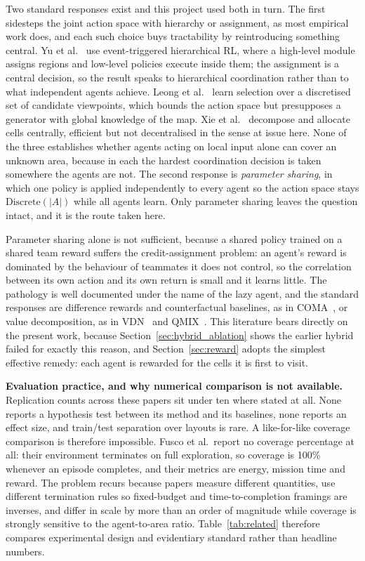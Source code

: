 \documentclass[a4paper, 10pt, conference]{ieeeconf}
\begin{document}
Two standard responses exist and this project used both in turn. The
first sidesteps the joint action space with hierarchy or assignment,
as most empirical work does, and each such choice buys tractability by
reintroducing something central. Yu et al.~\cite{yu2025} use
event-triggered hierarchical RL, where a high-level module assigns
regions and low-level policies execute inside them; the assignment is
a central decision, so the result speaks to hierarchical coordination
rather than to what independent agents achieve. Leong et
al.~\cite{leong2024} learn selection over a discretised set of
candidate viewpoints, which bounds the action space but presupposes a
generator with global knowledge of the map. Xie et al.~\cite{xie2025}
decompose and allocate cells centrally, efficient but not
decentralised in the sense at issue here. None of the three
establishes whether agents acting on local input alone can cover an
unknown area, because in each the hardest coordination decision is
taken somewhere the agents are not. The second response is
\emph{parameter sharing}, in which one policy is applied independently
to every agent so the action space stays $\text{Discrete}(|A|)$ while
all agents learn. Only parameter sharing leaves the question intact,
and it is the route taken here.

Parameter sharing alone is not sufficient, because a shared policy
trained on a shared team reward suffers the credit-assignment problem:
an agent's reward is dominated by the behaviour of teammates it does
not control, so the correlation between its own action and its own
return is small and it learns little. The pathology is well documented
under the name of the lazy agent, and the standard responses are
difference rewards and counterfactual baselines, as in
COMA~\cite{foerster2018}, or value decomposition, as in
VDN~\cite{sunehag2018} and QMIX~\cite{rashid2018}. This literature
bears directly on the present work, because
Section~\ref{sec:hybrid_ablation} shows the earlier hybrid failed for
exactly this reason, and Section~\ref{sec:reward} adopts the simplest
effective remedy: each agent is rewarded for the cells it is first to
visit.

\textbf{Evaluation practice, and why numerical comparison is not
available.} Replication counts across these papers sit under ten where
stated at all. None reports a hypothesis test between its method and
its baselines, none reports an effect size, and train/test separation
over layouts is rare. A like-for-like coverage comparison is therefore
impossible. Fusco et al.\ report no coverage percentage at all: their
environment terminates on full exploration, so coverage is 100\%
whenever an episode completes, and their metrics are energy, mission
time and reward. The problem recurs because papers measure different
quantities, use different termination rules so fixed-budget and
time-to-completion framings are inverses, and differ in scale by more
than an order of magnitude while coverage is strongly sensitive to the
agent-to-area ratio. Table~\ref{tab:related} therefore compares
experimental design and evidentiary standard rather than headline
numbers.
\end{document}
